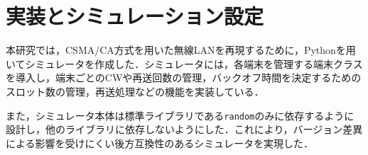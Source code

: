 \documentclass[a4paper, 10pt]{ltjsarticle}
\begin{document}

\section{実装とシミュレーション設定}

本研究では，CSMA/CA方式を用いた無線LANを再現するために，Pythonを用いてシミュレータを作成した．シミュレータには，各端末を管理する端末クラスを導入し，端末ごとのCWや再送回数の管理，バックオフ時間を決定するためのスロット数の管理，再送処理などの機能を実装している．

また，シミュレータ本体は標準ライブラリである\texttt{random}のみに依存するように設計し，他のライブラリに依存しないようにした．これにより，バージョン差異による影響を受けにくい後方互換性のあるシミュレータを実現した．



\end{document}
